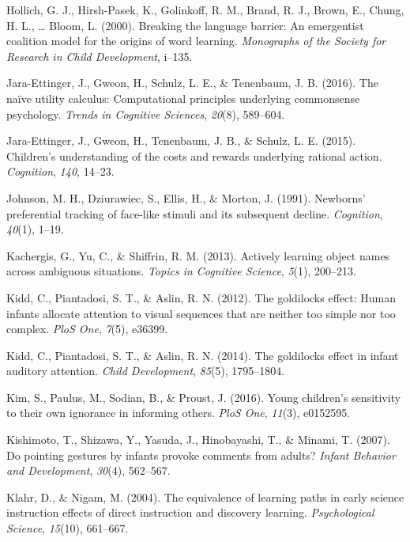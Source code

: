 \documentclass[english,floatsintext,man]{apa6}
\theoremstyle{definition}
\theoremstyle{definition}
\theoremstyle{definition}
\theoremstyle{remark}
\begin{document}
\hypertarget{ref-hollich2000breaking}{}
Hollich, G. J., Hirsh-Pasek, K., Golinkoff, R. M., Brand, R. J., Brown,
E., Chung, H. L., \ldots{} Bloom, L. (2000). Breaking the language
barrier: An emergentist coalition model for the origins of word
learning. \emph{Monographs of the Society for Research in Child
Development}, i--135.

\hypertarget{ref-jara2016naive}{}
Jara-Ettinger, J., Gweon, H., Schulz, L. E., \& Tenenbaum, J. B. (2016).
The naïve utility calculus: Computational principles underlying
commonsense psychology. \emph{Trends in Cognitive Sciences},
\emph{20}(8), 589--604.

\hypertarget{ref-jara2015children}{}
Jara-Ettinger, J., Gweon, H., Tenenbaum, J. B., \& Schulz, L. E. (2015).
Children's understanding of the costs and rewards underlying rational
action. \emph{Cognition}, \emph{140}, 14--23.

\hypertarget{ref-johnson1991newborns}{}
Johnson, M. H., Dziurawiec, S., Ellis, H., \& Morton, J. (1991).
Newborns' preferential tracking of face-like stimuli and its subsequent
decline. \emph{Cognition}, \emph{40}(1), 1--19.

\hypertarget{ref-kachergis2013actively}{}
Kachergis, G., Yu, C., \& Shiffrin, R. M. (2013). Actively learning
object names across ambiguous situations. \emph{Topics in Cognitive
Science}, \emph{5}(1), 200--213.

\hypertarget{ref-kidd2012goldilocks}{}
Kidd, C., Piantadosi, S. T., \& Aslin, R. N. (2012). The goldilocks
effect: Human infants allocate attention to visual sequences that are
neither too simple nor too complex. \emph{PloS One}, \emph{7}(5),
e36399.

\hypertarget{ref-kidd2014goldilocks}{}
Kidd, C., Piantadosi, S. T., \& Aslin, R. N. (2014). The goldilocks
effect in infant auditory attention. \emph{Child Development},
\emph{85}(5), 1795--1804.

\hypertarget{ref-kim2016young}{}
Kim, S., Paulus, M., Sodian, B., \& Proust, J. (2016). Young children's
sensitivity to their own ignorance in informing others. \emph{PloS One},
\emph{11}(3), e0152595.

\hypertarget{ref-kishimoto2007pointing}{}
Kishimoto, T., Shizawa, Y., Yasuda, J., Hinobayashi, T., \& Minami, T.
(2007). Do pointing gestures by infants provoke comments from adults?
\emph{Infant Behavior and Development}, \emph{30}(4), 562--567.

\hypertarget{ref-klahr2004equivalence}{}
Klahr, D., \& Nigam, M. (2004). The equivalence of learning paths in
early science instruction effects of direct instruction and discovery
learning. \emph{Psychological Science}, \emph{15}(10), 661--667.
\end{document}

